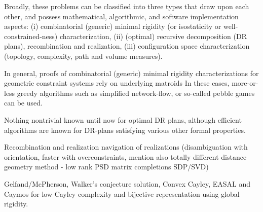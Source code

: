 Broadly, these problems can be classified into three types that draw upon each other, and possess mathematical, algorithmic, and software implementation aspects: (i) combinatorial (generic) minimal rigidity (or isostaticity or well-constrained-ness) characterization, (ii) (optimal) recursive decomposition (DR plans), recombination and realization, (iii) configuration space characterization (topology, complexity, path and volume measures).

In general, proofs of combinatorial (generic) minimal rigidity characterizations for geometric constraint systems rely on underlying matroids  In these cases, more-or-less greedy algorithms such as simplified network-flow, or so-called pebble games can be used.

Nothing nontrivial known until now for optimal DR plans, although efficient algorithms are known for DR-plans satisfying various other formal properties.

Recombination and realization navigation of realizations (disambiguation with orientation, faster with overconstraints, mention also totally different distance geometry method - low rank PSD matrix completions SDP/SVD)

Gelfand/McPherson, Walker's conjecture solution, Convex Cayley, EASAL and Caymos for low Cayley complexity and bijective representation using global rigidity.
